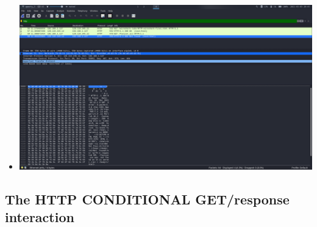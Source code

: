 \documentclass[11pt]{article}
\begin{document}
\begin{enumerate}
\begin{itemize}
  \item \includegraphics[width=\textwidth]{img/ws-raw-data-4}
  \end{itemize}
\end{enumerate}

\subsection{The HTTP CONDITIONAL GET/response interaction}
\end{document}

